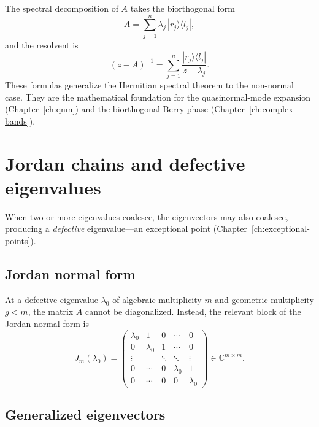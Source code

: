 The spectral decomposition of $A$ takes the biorthogonal form
\begin{equation}
 A = \sum_{j=1}^n \lambda_j\,|r_j\rangle\langle l_j|,
 \label{eq:spectral-biorthogonal}
\end{equation}
and the resolvent is
\begin{equation}
 (z - A)^{-1} = \sum_{j=1}^n \frac{|r_j\rangle\langle l_j|}
 {z - \lambda_j}.
 \label{eq:resolvent-biorthogonal}
\end{equation}
These formulas generalize the Hermitian spectral theorem to the
non-normal case. They are the mathematical foundation for the
quasinormal-mode expansion (Chapter~\ref{ch:qnm}) and the
biorthogonal Berry phase (Chapter~\ref{ch:complex-bands}).


\section{Jordan chains and defective eigenvalues}
\label{sec:jordan-app}

When two or more eigenvalues coalesce, the eigenvectors may also
coalesce, producing a \emph{defective} eigenvalue---an exceptional
point (Chapter~\ref{ch:exceptional-points}).

\subsection{Jordan normal form}
\label{ssec:jordan-form}

At a defective eigenvalue $\lambda_0$ of algebraic multiplicity $m$ and
geometric multiplicity $g < m$, the matrix $A$ cannot be diagonalized.
Instead, the relevant block of the Jordan normal form is
\begin{equation}
 J_m(\lambda_0) = \begin{pmatrix}
 \lambda_0 & 1 & 0 & \cdots & 0 \\
 0 & \lambda_0 & 1 & \cdots & 0 \\
 \vdots & & \ddots & \ddots & \vdots \\
 0 & \cdots & 0 & \lambda_0 & 1 \\
 0 & \cdots & 0 & 0 & \lambda_0
 \end{pmatrix}
 \in \mathbb{C}^{m \times m}.
 \label{eq:jordan-block-app}
\end{equation}

\subsection{Generalized eigenvectors}
\label{ssec:generalized-evecs}

